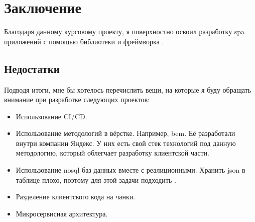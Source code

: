 \section{Заключение}
Благодаря данному курсовому проекту, я поверхностно освоил разработку \acrshort{spa} приложений с помощью библиотеки \textcite{react} и фреймворка \textcite{express}.

\subsection{Недостатки}
Подводя итоги, мне бы хотелось перечислить вещи, на которые я буду обращать внимание при разработке следующих проектов:
\begin{itemize}
    \item Использование CI/CD.
    \item Использование методологий в вёрстке. Например, \acrfull{bem}. Её разработали внутри компании Яндекс. У них есть свой стек технологий под данную методологию, который облегчает разработку клиентской части.
    \item Использование \acrshort{nosql} баз данных вместе с реалиционными. Хранить \acrshort{json} в таблице плохо, поэтому для этой задачи подходить \textcite{mongodb}.
    \item Разделение клиентского кода на чанки.
    \item Микросервисная архитектура.
\end{itemize}

\clearpage